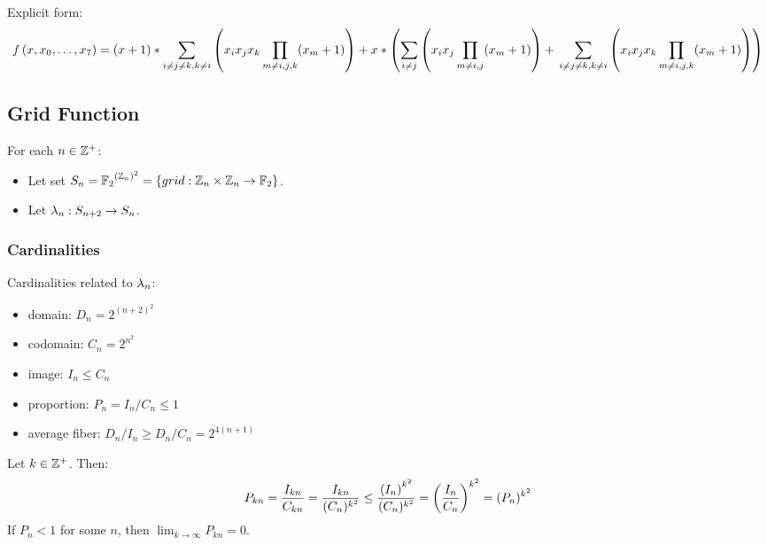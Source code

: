 \documentclass[letterpaper, 14pt]{extarticle}
\begin{document}
\begin{flushleft}
\begin{remark}
Explicit form:
\begin{dmath*}
\lp = (\cell + 1) *
\sum_{i \ne j \ne k, k \ne i}\parentheses
{\cell_i \cell_j \cell_k
\prod_{m \ne i, j, k}(\cell_m + 1)} + \\
\cell * \parentheses
{\sum_{i \ne j}\parentheses
{\cell_i \cell_j \prod_{m \ne i, j}(\cell_m + 1)} + \\
\sum_{i \ne j \ne k, k \ne i}\parentheses
{\cell_i \cell_j \cell_k
\prod_{m \ne i, j, k}(\cell_m + 1)}}
\end{dmath*}
\end{remark}


\subsection{Grid Function}

\begin{definition}
For each $n \in \mathbb{Z}^+$:
\begin{itemize}
\item Let set $S_{n} = {\mathbb{F}_2}^{{\left( \mathbb{Z}_n \right)}^2} =
  \{grid: \mathbb{Z}_n \times \mathbb{Z}_n \to \mathbb{F}_2\}$.
\item Let 
  $\lambda_{n}: S_{n+2} \to S_{n}$.
\end{itemize}
\end{definition}


\subsubsection{Cardinalities}

\begin{remark}
Cardinalities related to $\lambda_{n}$:
\begin{itemize}
\item domain: $D_n = 2^{(n+2)^2}$
\item codomain: $C_n = 2^{n^2}$
\item image: $I_n \le C_n$
\item proportion: $P_n = I_n / C_n \le 1$
\item average fiber: $D_n / I_n \ge D_n / C_n = 2^{4(n+1)}$
\end{itemize}
\end{remark}

\begin{remark}
Let $k \in \mathbb{Z}^+$. Then:
$$P_{k n} = \frac{I_{k n}}{C_{k n}}
= \frac{I_{k n}}{(C_n)^{k^2}}
\le \frac{{(I_n)}^{k^2}}{(C_n)^{k^2}}
= \left( \frac{I_n}{C_n} \right)^{k^2}
= (P_n)^{k^2}$$
If $P_n < 1$ for some $n$,
then $\lim_{k \to \infty} P_{kn} = 0$.
\end{remark}


\end{flushleft}
\end{document}
